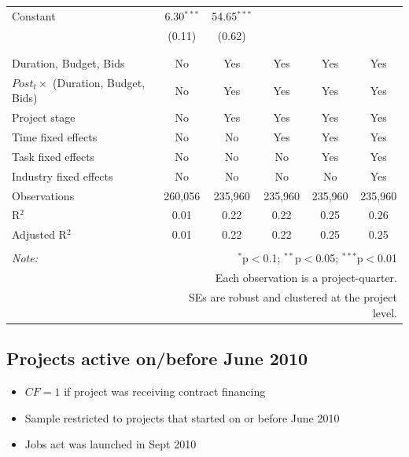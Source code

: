\documentclass[
]{article}
\providecommand{\tightlist}{%
  \setlength{\itemsep}{0pt}\setlength{\parskip}{0pt}}
\begin{document}
\begin{table}[H]
\begin{tabular}{@{\extracolsep{-2pt}}lccccc}
 Constant & 6.30$^{***}$ & 54.65$^{***}$ &  &  &  \\ 
  & (0.11) & (0.62) &  &  &  \\ 
  & & & & & \\ 
\hline \\[-1.8ex] 
Duration, Budget, Bids & No & Yes & Yes & Yes & Yes \\ 
$Post_t \times $  (Duration, Budget, Bids) & No & Yes & Yes & Yes & Yes \\ 
Project stage & No & Yes & Yes & Yes & Yes \\ 
Time fixed effects & No & No & Yes & Yes & Yes \\ 
Task fixed effects & No & No & No & Yes & Yes \\ 
Industry fixed effects & No & No & No & No & Yes \\ 
Observations & 260,056 & 235,960 & 235,960 & 235,960 & 235,960 \\ 
R$^{2}$ & 0.01 & 0.22 & 0.22 & 0.25 & 0.26 \\ 
Adjusted R$^{2}$ & 0.01 & 0.22 & 0.22 & 0.25 & 0.25 \\ 
\hline 
\hline \\[-1.8ex] 
\textit{Note:}  & \multicolumn{5}{r}{$^{*}$p$<$0.1; $^{**}$p$<$0.05; $^{***}$p$<$0.01} \\ 
 & \multicolumn{5}{r}{Each observation is a project-quarter.} \\ 
 & \multicolumn{5}{r}{SEs are robust and clustered at the project level.} \\ 
\end{tabular} 
\end{table}

\hypertarget{projects-active-onbefore-june-2010}{%
\subsection{Projects active on/before June
2010}\label{projects-active-onbefore-june-2010}}

\begin{itemize}
\tightlist
\item
  \(CF=1\) if project was receiving contract financing
\item
  Sample restricted to projects that started on or before June 2010
\item
  Jobs act was launched in Sept 2010
\end{itemize}
\end{document}

